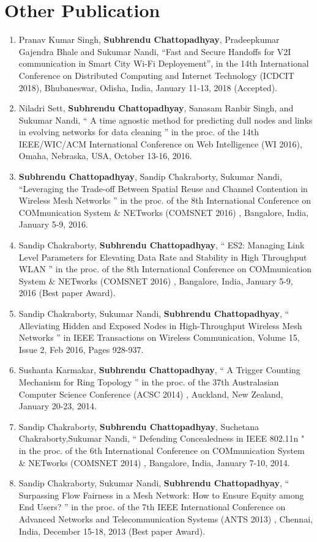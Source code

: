 \section*{Other Publication}
\begin{enumerate}
 \item Pranav Kumar  Singh, \textbf{Subhrendu Chattopadhyay}, Pradeepkumar Gajendra Bhale and Sukumar Nandi, ``Fast and Secure Handoffs for V2I communication in Smart City Wi-Fi Deployement'', in the 14th International Conference on Distributed Computing and Internet Technology (ICDCIT 2018), Bhubaneswar, Odisha, India, January 11-13, 2018 (Accepted).
 \item Niladri Sett, \textbf{Subhrendu Chattopadhyay}, Sanasam Ranbir Singh, and Sukumar Nandi, `` A time agnostic method for predicting dull nodes and links in evolving networks for data cleaning '' in the proc. of the 14th IEEE/WIC/ACM International Conference on Web Intelligence (WI 2016), Omaha, Nebraska, USA, October 13-16, 2016. 
 \item \textbf{Subhrendu Chattopadhyay}, Sandip Chakraborty, Sukumar Nandi, ``Leveraging the Trade-off Between Spatial Reuse and Channel Contention in Wireless Mesh Networks '' in the proc. of the 8th International Conference on COMmunication System \& NETworks (COMSNET 2016) , Bangalore, India, January 5-9, 2016.
 \item Sandip Chakraborty, \textbf{Subhrendu Chattopadhyay}, `` ES2: Managing Link Level Parameters for Elevating Data Rate and Stability in High Throughput WLAN '' in the proc. of the 8th International Conference on COMmunication System \& NETworks (COMSNET 2016) , Bangalore, India, January 5-9, 2016 (Best paper Award).
 \item Sandip Chakraborty, Sukumar Nandi, \textbf{Subhrendu Chattopadhyay}, `` Alleviating Hidden and Exposed Nodes in High-Throughput Wireless Mesh Networks '' in IEEE Transactions on Wireless Communication, Volume 15, Issue 2, Feb 2016, Pages 928-937.
 \item Sushanta Karmakar, \textbf{Subhrendu Chattopadhyay}, `` A Trigger Counting Mechanism for Ring Topology '' in the proc. of the 37th Australasian Computer Science Conference (ACSC 2014) , Auckland, New Zealand, January 20-23, 2014.
 \item Sandip Chakraborty, \textbf{Subhrendu Chattopadhyay}, Suchetana Chakraborty,Sukumar Nandi, `` Defending Concealedness in IEEE 802.11n " in the proc. of the 6th International Conference on COMmunication System \& NETworks (COMSNET 2014) , Bangalore, India, January 7-10, 2014.
  \item Sandip Chakraborty, Sukumar Nandi, \textbf{Subhrendu Chattopadhyay}, `` Surpassing Flow Fairness in a Mesh Network: How to Ensure Equity among End Users? '' in the proc. of the 7th IEEE International Conference on Advanced Networks and Telecommunication Systems (ANTS 2013) , Chennai, India, December 15-18, 2013 (Best paper Award). 
\end{enumerate}
